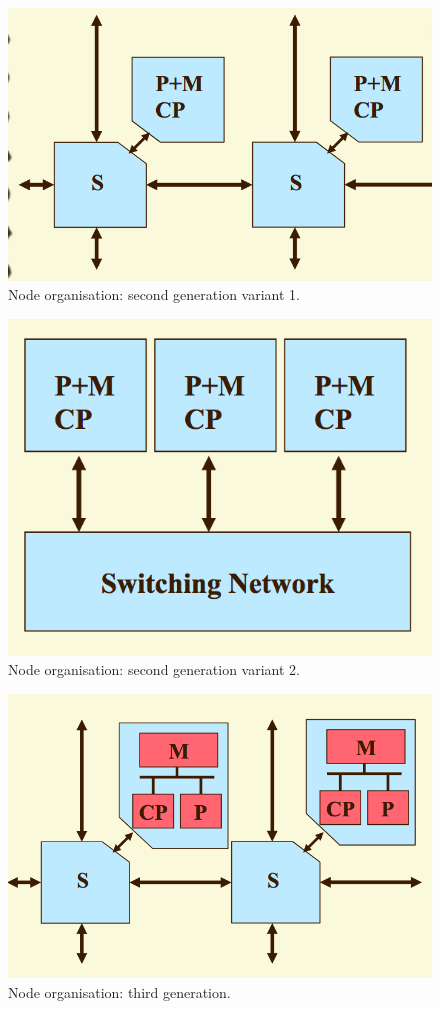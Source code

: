 \begin{figure}
\centering
\includegraphics[width=0.5\linewidth]{figures/screenshot119}
\caption{Node organisation: second generation variant 1.}
\label{fig:screenshot119}
\end{figure}

\begin{figure}
\centering
\includegraphics[width=0.5\linewidth]{figures/screenshot120}
\caption{Node organisation: second generation variant 2.}
\label{fig:screenshot120}
\end{figure}

\begin{figure}
\centering
\includegraphics[width=0.5\linewidth]{figures/screenshot121}
\caption{Node organisation: third generation.}
\label{fig:screenshot121}
\end{figure}

